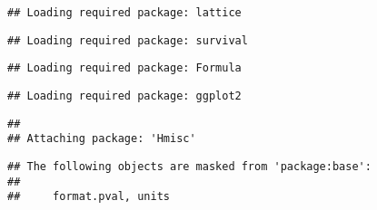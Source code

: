 \documentclass[
]{article}
\newenvironment{Shaded}{\begin{snugshade}}{\end{snugshade}}
\newcommand{\AttributeTok}[1]{\textcolor[rgb]{0.77,0.63,0.00}{#1}}
\newcommand{\CommentTok}[1]{\textcolor[rgb]{0.56,0.35,0.01}{\textit{#1}}}
\newcommand{\ConstantTok}[1]{\textcolor[rgb]{0.00,0.00,0.00}{#1}}
\newcommand{\DecValTok}[1]{\textcolor[rgb]{0.00,0.00,0.81}{#1}}
\newcommand{\FloatTok}[1]{\textcolor[rgb]{0.00,0.00,0.81}{#1}}
\newcommand{\FunctionTok}[1]{\textcolor[rgb]{0.00,0.00,0.00}{#1}}
\newcommand{\NormalTok}[1]{#1}
\newcommand{\SpecialCharTok}[1]{\textcolor[rgb]{0.00,0.00,0.00}{#1}}
\newcommand{\StringTok}[1]{\textcolor[rgb]{0.31,0.60,0.02}{#1}}
\begin{document}
\begin{verbatim}
## Loading required package: lattice
\end{verbatim}

\begin{verbatim}
## Loading required package: survival
\end{verbatim}

\begin{verbatim}
## Loading required package: Formula
\end{verbatim}

\begin{verbatim}
## Loading required package: ggplot2
\end{verbatim}

\begin{verbatim}
## 
## Attaching package: 'Hmisc'
\end{verbatim}

\begin{verbatim}
## The following objects are masked from 'package:base':
## 
##     format.pval, units
\end{verbatim}

\begin{Shaded}
\end{Shaded}
\end{document}
